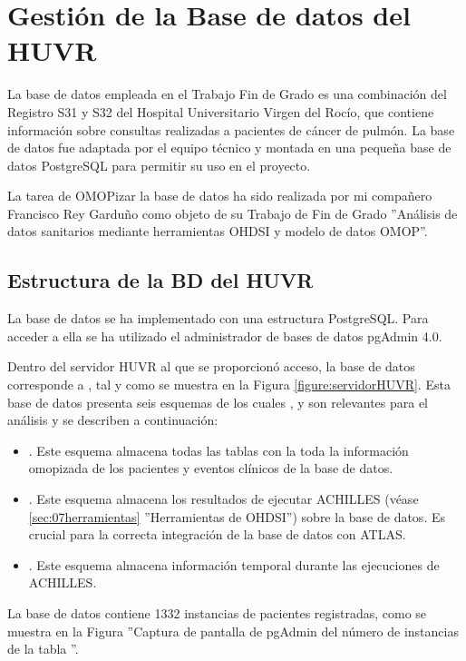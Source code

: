 \chapter{Gestión de la Base de datos del HUVR} \label{cap:02Datos}

La base de datos empleada en el Trabajo Fin de Grado es una combinación del Registro S31 y S32 del Hospital Universitario Virgen del Rocío, que contiene información sobre consultas realizadas a pacientes de cáncer de pulmón. La base de datos fue adaptada por el equipo técnico y montada en una pequeña base de datos PostgreSQL para permitir su uso en el proyecto. 

La tarea de OMOPizar la base de datos ha sido realizada por mi compañero Francisco Rey Garduño como objeto de su Trabajo de Fin de Grado ''Análisis de datos sanitarios mediante herramientas OHDSI y modelo de datos OMOP''.


\section{Estructura de la BD del HUVR}

La base de datos se ha implementado con una estructura PostgreSQL. Para acceder a ella se ha utilizado el administrador de bases de datos pgAdmin 4.0. 

Dentro del servidor HUVR al que se proporcionó acceso, la base de datos corresponde a , tal y como se muestra en la Figura \ref{figure:servidorHUVR}. Esta base de datos presenta seis esquemas de los cuales ,  y  son relevantes para el análisis y se describen a continuación:

\begin{itemize}
    \item \textbf{}. Este esquema almacena todas las tablas con la toda la información omopizada de los pacientes y eventos clínicos de la base de datos.
    \item \textbf{}. Este esquema almacena los resultados de ejecutar ACHILLES (véase \ref{sec:07herramientas} ''Herramientas de OHDSI'') sobre la base de datos. Es crucial para la correcta integración de la base de datos con ATLAS.
    \item \textbf{}. Este esquema almacena información temporal durante las ejecuciones de ACHILLES.
\end{itemize}

La base de datos contiene 1332 instancias de pacientes registradas, como se muestra en la Figura ''Captura de pantalla de pgAdmin del número de instancias de la tabla ''.

